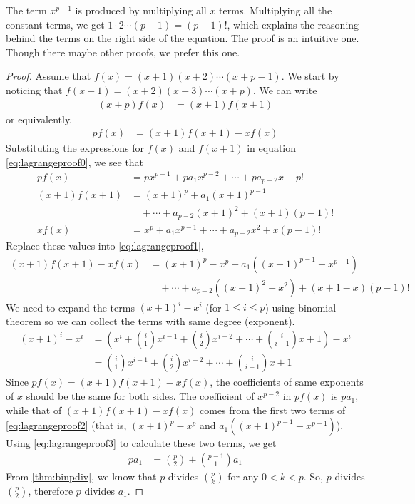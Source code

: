 \documentclass[12pt]{subfile}
\begin{document}
	The term $x^{p-1}$ is produced by multiplying all $x$ terms. Multiplying all the constant terms, we get $1\cdot2\cdots(p-1)=(p-1)!$, which explains the reasoning behind the terms on the right side of the equation. The proof is an intuitive one. Though there maybe other proofs, we prefer this one.

		\begin{proof}[Proof]
			Assume that $f(x)=(x+1)(x+2)\cdots(x+p-1)$. We start by noticing that $f(x+1)  = (x+2) (x+3) \cdots (x+p)$. We can write
				\begin{align*}
					(x+p)f(x) &=(x+1)f(x+1)
				\end{align*}
			or equivalently,
				\begin{align}\label{eq:lagrangeproof1}
					 pf(x) &=(x+1)f(x+1)-xf(x)
				\end{align}
			Substituting the expressions for $f(x)$ and $f(x+1)$ in equation \eqref{eq:lagrangeproof0}, we see that
				\begin{align*}
					pf(x) & = px^{p-1}+pa_1x^{p-2}+\cdots+pa_{p-2}x+p!\\
					(x+1)f(x+1) & = (x+1)^p+a_1(x+1)^{p-1}\\ & \quad +\cdots+a_{p-2}(x+1)^2+(x+1)(p-1)!\\
					xf(x) & = x^p+a_1x^{p-1}+\cdots+a_{p-2}x^2+x(p-1)!
				\end{align*}
			Replace these values into \eqref{eq:lagrangeproof1},
				\begin{align}\label{eq:lagrangeproof2}
					(x+1)f(x+1)-xf(x)
						& = (x+1)^p-x^p+a_1((x+1)^{p-1}-x^{p-1}) \nonumber\\
						& \quad +\cdots+a_{p-2}((x+1)^2-x^2)+(x+1-x)(p-1)!
				\end{align}
			We need to expand the terms $(x+1)^i - x^i$ (for $1 \leq i \leq p$) using binomial theorem so we can collect the terms with same degree (exponent).
				\begin{align}\label{eq:lagrangeproof3}
					(x+1)^i-x^i
						& = \left(x^i+\binom{i}{1}x^{i-1} + \binom{i}{2} x^{i-2}+\cdots+ \binom{i}{i-1} x + 1\right)-x^i \nonumber\\
						& = \binom{i}{1}x^{i-1} + \binom{i}{2} x^{i-2}+\cdots+ \binom{i}{i-1} x + 1
				\end{align}
			Since $pf(x) = (x+1)f(x+1)-xf(x)$, the coefficients of same exponents of $x$ should be the same for both sides. The coefficient of $x^{p-2}$ in $pf(x)$ is $pa_1$, while that of $(x+1)f(x+1)-xf(x)$ comes from the first two terms of \eqref{eq:lagrangeproof2} (that is, $(x+1)^p-x^p$ and $a_1((x+1)^{p-1}-x^{p-1})$). Using \eqref{eq:lagrangeproof3} to calculate these two terms, we get
				\begin{align*}
					pa_1 & = \binom{p}{2}+\binom{p-1}{1}a_1
				\end{align*}
			From \autoref{thm:binpdiv}, we know that $p$ divides $\binom{p}{k}$ for any $0<k<p$. So, $p$ divides $\binom{p}{2}$, therefore $p$ divides $a_1$.


\end{proof}
\end{document}
